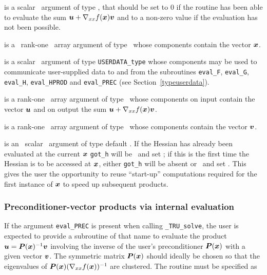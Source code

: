 \documentclass{galahad}
\newcommand{\packagename}{TRU}
\newcommand{\fullpackagename}{\libraryname\_\packagename}
\newcommand{\solver}{{\tt \fullpackagename\_solve}}
\begin{document}
\begin{description}
 is a scalar \intentout\ argument of type \integer,
that should be set to 0 if the routine has been able to evaluate the
sum ${\bm{u}} + \nabla_{xx} f({\bm{x}}) {\bm{v}}$
and to a non-zero value if the evaluation has not been possible.

 is a \ rank-one \intentin\ array argument of type
\realdp\ whose components contain the vector ${\bm{x}}$.

 is a scalar \intentinout\ argument of type
{\tt USERDATA\_type} whose components may be used
to communicate user-supplied data to and from the
subroutines {\tt eval\_F}, {\tt eval\_G},
{\tt eval\_H}, {\tt eval\_HPROD} and {\tt eval\_PREC}
(see Section~\ref{typeuserdata}).

 is a rank-one \intentinout\ array argument of type \realdp\
whose components on input contain the vector ${\bm{u}}$ and on output the
sum ${\bm{u}} + \nabla_{xx} f({\bm{x}}) {\bm{v}}$.

 is a rank-one \intentin\ array argument of type \realdp\
whose components contain the vector ${\bm{v}}$.

 is an \optional\ scalar \intentin\ argument of type default
\logical. If the Hessian has already been evaluated at the current ${\bm{x}}$
{\tt got\_h} will be \present\ and set \true; if this is the first time
the Hessian is to be accessed at ${\bm{x}}$, either {\tt got\_h} will be absent
or \present\ and set \false. This gives the user the opportunity
to reuse ``start-up'' computations required for the first instance of
${\bm{x}}$ to speed up subsequent products.

\end{description}


\subsubsection{Preconditioner-vector products via internal evaluation\label{pv}}

If the argument {\tt eval\_PREC} is present when calling \solver, the
user is expected to provide a subroutine of that name to evaluate the
product ${\bm{u}} = {\bm{P}}({\bm{x}})^{-1} {\bm{v}}$ involving the inverse of the user's 
preconditioner ${\bm{P}}({\bm{x}})$ with a given vector ${\bm{v}}$. 
The symmetric matrix ${\bm{P}}({\bm{x}})$ should ideally be chosen so that the 
eigenvalues of ${\bm{P}}({\bm{x}}) (\nabla_{xx} f({\bm{x}}))^{-1}$ are clustered.
The routine must be specified as
\end{document}

